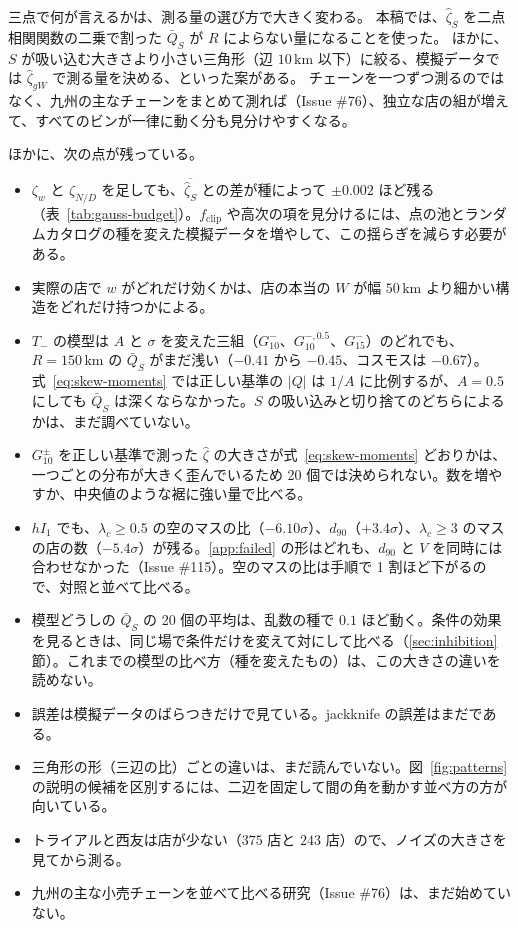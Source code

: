 \documentclass[a4paper,11pt]{ltjsarticle}
\begin{document}
三点で何が言えるかは、測る量の選び方で大きく変わる。
本稿では、$\hat\zeta_S$ を二点相関関数の二乗で割った $\bar Q_S$ が $R$ によらない量になることを使った。
ほかに、$S$ が吸い込む大きさより小さい三角形（辺 $10\,\mathrm{km}$ 以下）に絞る、模擬データでは $\hat\zeta_{gW}$ で測る量を決める、といった案がある。
チェーンを一つずつ測るのではなく、九州の主なチェーンをまとめて測れば（Issue \#76）、独立な店の組が増えて、すべてのビンが一律に動く分も見分けやすくなる。

ほかに、次の点が残っている。
\begin{itemize}
  \item $\zeta_w$ と $\zeta_{N/D}$ を足しても、$\overline{\hat\zeta_S}$ との差が種によって $\pm 0.002$ ほど残る（表~\ref{tab:gauss-budget}）。$f_{\mathrm{clip}}$ や高次の項を見分けるには、点の池とランダムカタログの種を変えた模擬データを増やして、この揺らぎを減らす必要がある。
  \item 実際の店で $w$ がどれだけ効くかは、店の本当の $W$ が幅 $50\,\mathrm{km}$ より細かい構造をどれだけ持つかによる。
  \item $T_-$ の模型は $A$ と $\sigma$ を変えた三組（$G_{10}^{-}$、$G_{10}^{-,0.5}$、$G_{15}^{-}$）のどれでも、$R = 150\,\mathrm{km}$ の $\bar Q_S$ がまだ浅い（$-0.41$ から $-0.45$、コスモスは $-0.67$）。式~\eqref{eq:skew-moments} では正しい基準の $|Q|$ は $1/A$ に比例するが、$A = 0.5$ にしても $\bar Q_S$ は深くならなかった。$S$ の吸い込みと切り捨てのどちらによるかは、まだ調べていない。
  \item $G_{10}^{\pm}$ を正しい基準で測った $\hat\zeta$ の大きさが式~\eqref{eq:skew-moments} どおりかは、一つごとの分布が大きく歪んでいるため 20 個では決められない。数を増やすか、中央値のような裾に強い量で比べる。
  \item $hI_1$ でも、$\lambda_c \ge 0.5$ の空のマスの比（$-6.10\sigma$）、$d_{90}$（$+3.4\sigma$）、$\lambda_c \ge 3$ のマスの店の数（$-5.4\sigma$）が残る。\ref{app:failed} の形はどれも、$d_{90}$ と $V$ を同時には合わせなかった（Issue \#115）。空のマスの比は手順で 1 割ほど下がるので、対照と並べて比べる。
  \item 模型どうしの $\bar Q_S$ の 20 個の平均は、乱数の種で $0.1$ ほど動く。条件の効果を見るときは、同じ場で条件だけを変えて対にして比べる（\ref{sec:inhibition} 節）。これまでの模型の比べ方（種を変えたもの）は、この大きさの違いを読めない。
  \item 誤差は模擬データのばらつきだけで見ている。jackknife の誤差はまだである。
  \item 三角形の形（三辺の比）ごとの違いは、まだ読んでいない。図~\ref{fig:patterns} の説明の候補を区別するには、二辺を固定して間の角を動かす並べ方の方が向いている。
  \item トライアルと西友は店が少ない（$375$ 店と $243$ 店）ので、ノイズの大きさを見てから測る。
  \item 九州の主な小売チェーンを並べて比べる研究（Issue \#76）は、まだ始めていない。
\end{itemize}
\end{document}
